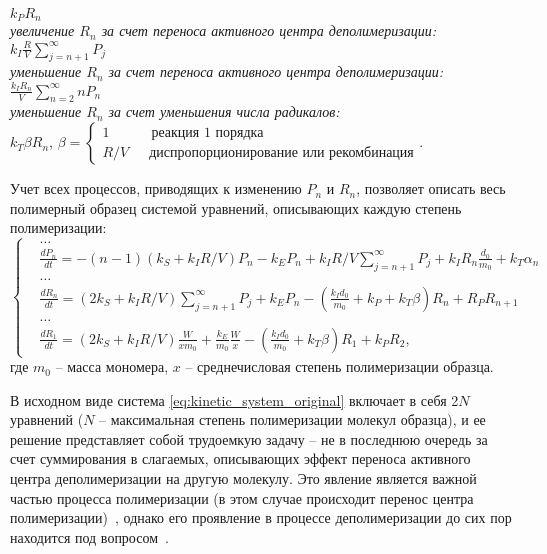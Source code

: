 \begin{center}
	$k_P R_n$ \\
	\textit{увеличение $R_n$ за счет переноса активного центра деполимеризации:} \\
	${\displaystyle k_I \frac{R}{V} \sum_{j=n+1}^{\infty} P_j}$ \\
	\textit{уменьшение $R_n$ за счет переноса активного центра деполимеризации:} \\
	${\displaystyle \frac{k_I R_n}{V} \sum_{n=2}^{\infty} n P_n}$ \\
	\textit{уменьшение $R_n$ за счет уменьшения числа радикалов:} \\
	$k_T \beta R_n$, $\beta = \left\{
	\begin{array}{l}
		1 \quad\quad\quad \text{реакция 1 порядка} \\
		R / V \quad\;\: \text{диспропорционирование или рекомбинация}
	\end{array}\right..$ \\
\end{center}

Учет всех процессов, приводящих к изменению $P_n$ и $R_n$, позволяет описать весь полимерный образец системой уравнений, описывающих каждую степень полимеризации:
\begin{equation} \label{eq:kinetic_system_original}
	\left\{
	\begin{aligned}
		&\dots \\
		&\frac{d P_n}{d t}=-(n-1)\left(k_S+k_I R / V\right) P_n-k_E P_n+k_I R / V \sum_{j=n+1}^{\infty} P_j+k_I R_n \frac{d_0}{m_0}+k_T \alpha_n \\
		&\dots \\
		&\frac{d R_n}{d t}=\left(2 k_S+k_I R / V\right) \sum_{j=n+1}^{\infty} P_j+k_E P_n-\left(\frac{k_I d_0}{m_0}+k_P+k_T \beta\right) R_n+R_P R_{n+1} \\
		&\dots \\
		&\frac{d R_1}{d t}=\left(2 k_S+k_I R / V\right) \frac{W}{x m_0}+\frac{k_E}{m_0} \frac{W}{x}-\left(\frac{k_I d_0}{m_0}+k_T \beta\right) R_1+k_P R_2,
	\end{aligned}
	\right.
\end{equation}
где $m_0$ -- масса мономера, $x$ -- среднечисловая степень полимеризации образца. 

В исходном виде система \ref{eq:kinetic_system_original} включает в себя 2$N$ уравнений ($N$ -- максимальная степень полимеризации молекул образца), и ее решение представляет собой трудоемкую задачу -- не в последнюю очередь за счет суммирования в слагаемых, описывающих эффект переноса активного центра деполимеризации на другую молекулу. Это явление является важной частью процесса полимеризации (в этом случае происходит перенос центра полимеризации)~\cite{chain_transfer_polymerization}, однако его проявление в процессе деполимеризации до сих пор находится под вопросом~\cite{Mita_PMMA_zip_lengths_T}.

